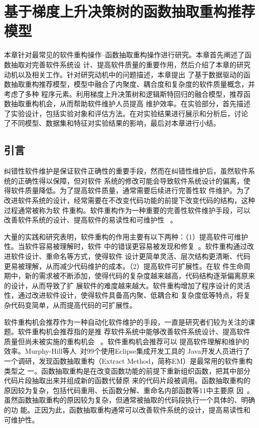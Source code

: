 

\chapter{基于梯度上升决策树的函数抽取重构推荐模型} 
本章针对最常见的软件重构操作--函数抽取重构操作进行研究。本章首先阐述了函数抽取对完善软件系统设
计、提高软件质量的重要作用，然后介绍了本章的研究动机以及相关工作。针对研究动机中的问题描述，本章提出
了基于数据驱动的函数抽取重构推荐模型，模型中融合了内聚度、耦合度和复杂度的软件质量概念，并考虑了多种
程序元素。利用梯度上升决策树和逻辑斯特回归的融合模型，推荐函数抽取重构机会，从而帮助软件维护人员提高
维护效率。在实验部分，首先描述了实验设计，包括实验对象和评估方法。在对实验结果进行展示和分析后，讨论
了不同模型、数据集和特征对实验结果的影响，最后对本章进行小结。

\section{引言}
纠错性软件维护是保证软件正确性的重要手段，然而在纠错性维护后，虽然软件系统的正确性得以保障，但对软件
系统的修改可能会导致软件系统设计的偏离，使得软件质量降低。为了提高软件质量，通常需要后续进行完善性软
件维护。为了改进软件系统的设计，经常需要在不改变代码功能的前提下改变代码的结构，这种过程通常被称为软
件重构。软件重构作为一种重要的完善性软件维护手段，可以改善软件系统的设计、提高软件的易读性和可维护性
~\cite{fowler,mens:TSE04}。

大量的实践和研究表明，软件重构的作用主要有以下两种：（1）提高软件可维护性。当软件容易被理解时，软件
中的错误更容易被发现和修复~\cite{martin2009clean}。软件重构通过改进软件设计、重命名等方式，使得软件
设计更简单灵活、层次结构更清晰、代码更易被理解，从而减少代码维护的成本。（2）提高软件可扩展性。在软
件生命周期中，新的需求被不断添加，使得代码的复杂度越来越高，代码结构逐渐偏离原来的设计，从而导致了扩
展软件的难度越来越大。软件重构增加了程序设计的灵活性，通过改进软件设计，使得软件具备高内聚、低耦合和
复杂度低等特点，将复杂代码变简单，从而提高代码的可扩展性。

软件重构机会推荐作为一种自动化软件维护的手段，一直是研究者们较为关注的课题。软件重构机会推荐指的是推
荐软件系统中能够改善软件系统设计、提高软件质量但尚未被实施的重构机会
~\cite{fokaefs:icse11,higo:JSME,Liu:IEEE-TSE:12,Tourwe:CSMR03,Tsantalis:2011}。软件重构机会推荐可以
提高软件理解和维护的效率。Murphy-Hill等人~\cite{Murphy-Hill:ICSE09}对99个使用Eclipse集成开发工具的
Java开发人员进行了一个调研，发现函数抽取重构（Extract Method，简称EM）是最常用的软件重构类型之
一。函数抽取重构是在改变函数功能的前提下重新组织函数，把其中部分代码片段抽取出来并组成新的函数代替原
来的代码片段被调用。函数抽取重构的原因较为复杂，包括代码重用、长函数分解、重命名内部函数等11中主要原
因~\cite{silva2016we}。虽然函数抽取重构的原因较为复杂，但通常被抽取的代码段执行一个具体的、明确的功
能。正因为此，函数抽取重构通常可以改善软件系统的设计，提高易读性和可维护性。

